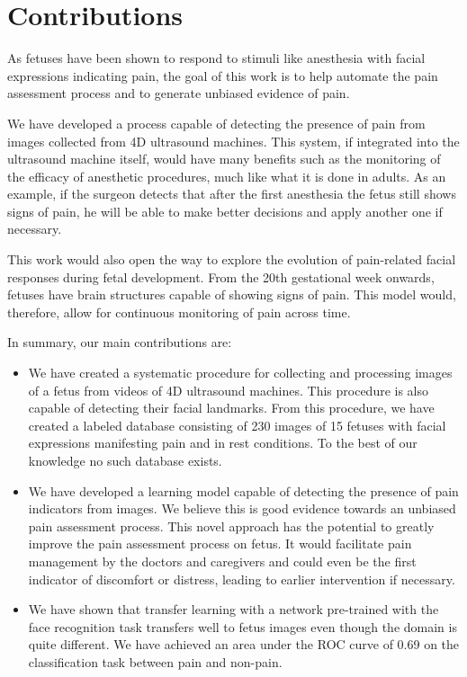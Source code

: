 \documentclass[msc]{ppgccufmg}
\begin{document}
\section{Contributions}

As fetuses have been shown to respond to stimuli like anesthesia with facial expressions indicating pain, the goal of this work is to help automate the pain assessment process and to generate unbiased evidence of pain. 

We have developed a process capable of detecting the presence of pain from images collected from 4D ultrasound machines. This system, if integrated into the ultrasound machine itself, would  have many benefits such as the monitoring of the efficacy of anesthetic procedures, much like what it is done in adults. As an example, if the surgeon detects that after the first anesthesia the fetus still shows signs of pain, he will be able to make better decisions and apply another one if necessary.

This work would also open the way to explore the evolution of pain-related facial responses during fetal development. From the 20th gestational week onwards, fetuses have brain structures capable of showing signs of pain. This model would, therefore, allow for continuous monitoring of pain across time.

In summary, our main contributions are:

\begin{itemize}
    \item We have created a systematic procedure for collecting and processing images of a fetus from videos of 4D ultrasound machines. This procedure is also capable of detecting their facial landmarks. From this procedure, we have created a labeled database consisting of 230 images of 15 fetuses with facial expressions manifesting pain and in rest conditions. To the best of our knowledge no such database exists.
    \item We have developed a learning model capable of detecting the presence of pain indicators from images. We believe this is good evidence towards an unbiased pain assessment process. This novel approach has the potential to greatly improve the pain assessment process on fetus. It would facilitate pain management by the doctors and caregivers and could even be the first indicator of discomfort or distress, leading to earlier intervention if necessary.
    \item We have shown that transfer learning with a network pre-trained with the face recognition task transfers well to fetus images even though the domain is quite different. We have achieved an area under the ROC curve of 0.69 on the classification task between pain and non-pain.
\end{itemize}
\end{document}
